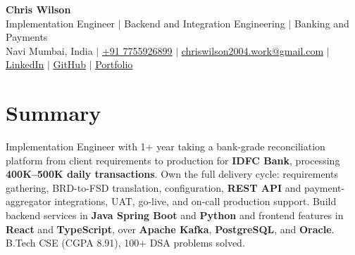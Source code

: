 \documentclass[letterpaper,10pt]{article}
\begin{document}
\begin{center}
    \textbf{\Huge Chris Wilson} \\ \vspace{3pt}
    \small Implementation Engineer $|$ Backend and Integration Engineering $|$ Banking and Payments \\ \vspace{2pt}
    \small
    Navi Mumbai, India $|$
    \href{tel:+917755926899}{\underline{+91 7755926899}} $|$
    \href{mailto:chriswilson2004.work@gmail.com}{\underline{chriswilson2004.work@gmail.com}} $|$
    \href{https://www.linkedin.com/in/chriswilson-dev/}{\underline{LinkedIn}} $|$
    \href{https://github.com/chriswilson-dev}{\underline{GitHub}} $|$
    \href{https://chriswilson-dev.vercel.app/}{\underline{Portfolio}}
\end{center}
\vspace{-4pt}

\section{Summary}
\vspace{2pt}
\small{Implementation Engineer with 1+ year taking a bank-grade reconciliation platform from client requirements to production for \textbf{IDFC Bank}, processing \textbf{400K--500K daily transactions}. Own the full delivery cycle: requirements gathering, BRD-to-FSD translation, configuration, \textbf{REST API} and payment-aggregator integrations, UAT, go-live, and on-call production support. Build backend services in \textbf{Java Spring Boot} and \textbf{Python} and frontend features in \textbf{React} and \textbf{TypeScript}, over \textbf{Apache Kafka}, \textbf{PostgreSQL}, and \textbf{Oracle}. B.Tech CSE (CGPA 8.91), 100+ DSA problems solved.}
\vspace{-4pt}

\end{document}
